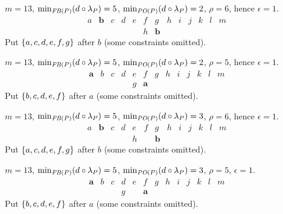 \documentclass[pagesize, twoside=off, bibliography=totoc, DIV=calc, fontsize=12pt, a4paper]{scrartcl}
\begin{document}
\begin{example}
	$m = 13$, $\minineq[\FBP] = 5$, $\minineq[\POP] = 2$, $\rho = 6$, hence $\epsilon = 1$.
	\begin{equation}
		\begin{array}{lllllllllllll}
			a	& \bm{b}	& c	& d	& e	& f	& g	& h	& i & j & k & l & m\\
			& & & & & h & \bm{b}
		\end{array}
	\end{equation}
	Put $\{a, c, d, e, f, g\}$ after $b$ (some constraints omitted).
\end{example}

\begin{example}
	$m = 13$, $\minineq[\FBP] = 5$, $\minineq[\POP] = 2$, $\rho = 5$, hence $\epsilon = 1$.
	\begin{equation}
		\begin{array}{lllllllllllll}
			\bm{a}	& b	& c	& d	& e	& f	& g	& h	& i & j & k & l & m\\
			& & & & g & \bm{a}
		\end{array}
	\end{equation}
	Put $\{b, c, d, e, f\}$ after $a$ (some constraints omitted).
\end{example}

\begin{example}
	$m = 13$, $\minineq[\FBP] = 5$, $\minineq[\POP] = 3$, $\rho = 6$, hence $\epsilon = 1$.
	\begin{equation}
		\begin{array}{lllllllllllll}
			a	& \bm{b}	& c	& d	& e	& f	& g	& h	& i & j & k & l & m\\
			& & & & h & & \bm{b}
		\end{array}
	\end{equation}
	Put $\{a, c, d, e, f, g\}$ after $b$ (some constraints omitted).
\end{example}

\begin{example}
	$m = 13$, $\minineq[\FBP] = 5$, $\minineq[\POP] = 3$, $\rho = 5$, $\epsilon = 1$.
	\begin{equation}
		\begin{array}{lllllllllllll}
			\bm{a}	& b	& c	& d	& e	& f	& g	& h	& i & j & k & l & m\\
			& & & g & & \bm{a}
		\end{array}
	\end{equation}
	Put $\{b, c, d, e, f\}$ after $a$ (some constraints omitted).
\end{example}
\end{document}
